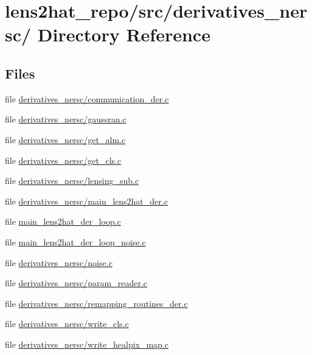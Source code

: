 \section{lens2hat\-\_\-repo/src/derivatives\-\_\-nersc/ Directory Reference}
\label{dir_d6736cdd7e51a1a2d59bc4797c9e5b53}
\subsection*{Files}
\begin{DoxyCompactItemize}
\item 
file \hyperlink{derivatives__nersc_2communication__der_8c}{derivatives\-\_\-nersc/communication\-\_\-der.\-c}
\item 
file \hyperlink{derivatives__nersc_2gaussran_8c}{derivatives\-\_\-nersc/gaussran.\-c}
\item 
file \hyperlink{derivatives__nersc_2get__alm_8c}{derivatives\-\_\-nersc/get\-\_\-alm.\-c}
\item 
file \hyperlink{derivatives__nersc_2get__cls_8c}{derivatives\-\_\-nersc/get\-\_\-cls.\-c}
\item 
file \hyperlink{derivatives__nersc_2lensing__sub_8c}{derivatives\-\_\-nersc/lensing\-\_\-sub.\-c}
\item 
file \hyperlink{derivatives__nersc_2main__lens2hat__der_8c}{derivatives\-\_\-nersc/main\-\_\-lens2hat\-\_\-der.\-c}
\item 
file \hyperlink{main__lens2hat__der__loop_8c}{main\-\_\-lens2hat\-\_\-der\-\_\-loop.\-c}
\item 
file \hyperlink{main__lens2hat__der__loop__noise_8c}{main\-\_\-lens2hat\-\_\-der\-\_\-loop\-\_\-noise.\-c}
\item 
file \hyperlink{derivatives__nersc_2noise_8c}{derivatives\-\_\-nersc/noise.\-c}
\item 
file \hyperlink{derivatives__nersc_2param__reader_8c}{derivatives\-\_\-nersc/param\-\_\-reader.\-c}
\item 
file \hyperlink{derivatives__nersc_2remapping__routines__der_8c}{derivatives\-\_\-nersc/remapping\-\_\-routines\-\_\-der.\-c}
\item 
file \hyperlink{derivatives__nersc_2write__cls_8c}{derivatives\-\_\-nersc/write\-\_\-cls.\-c}
\item 
file \hyperlink{derivatives__nersc_2write__healpix__map_8c}{derivatives\-\_\-nersc/write\-\_\-healpix\-\_\-map.\-c}
\end{DoxyCompactItemize}
